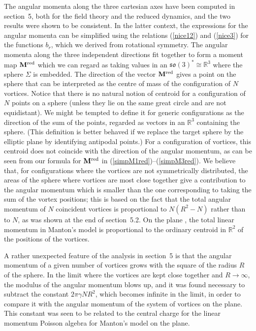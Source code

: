 \documentclass[a4paper,11pt]{article}
\begin{document}
The angular momenta along the three cartesian axes have been computed 
in section~5, both for the field theory and the reduced dynamics,
and the two results were shown to be consistent. In the latter
context, the expressions for the angular momenta can be simplified
using the relations (\ref{nice12}) and (\ref{nice3}) for the functions
$b_{r}$, which we derived from rotational symmetry. The angular momenta
along the three independent directions fit together to form a moment
map $\mathbf{M}^{\rm red}$ which we can regard as taking values in
an $\mathfrak{so}(3)^{*} \cong \mathbb{R}^{3}$ where the sphere $\Sigma$
is embedded. The direction of the vector $\mathbf{M}^{\rm red}$
gives a point on the sphere that can be interpreted as the
centre of mass of the configuration of $N$ vortices. 
Notice that there is no natural notion of
centroid for a configuration of $N$ points on a sphere (unless
they lie on the same great circle and are not equidistant). We might be
tempted to define it for generic configurations as the direction of the 
sum of the points,
regarded as vectors in an $\mathbb{R}^{3}$ containing the sphere.
(This definition is better behaved if we replace the target
sphere by the elliptic plane by identifying antipodal points.)
For a configuration of vortices, this centroid does not coincide
with the direction of the angular momentum, as can be seen from our
formula for $\mathbf{M}^{\rm red}$ in (\ref{simpM1red})--(\ref{simpM3red}).  
We believe that, for configurations where the vortices are not symmetrically
distributed, the areas of the sphere where vortices are most close
together give a contribution to the angular momentum which is smaller
than the one corresponding to taking the sum of the vortex positions; this is
based on the fact that the total angular momentum of $N$ coincident 
vortices is proportional to $N(R^{2}-N)$ rather than to $N$, as was
shown at the end of section~5.2. On the plane \cite{MNcl}, the
total linear momentum in Manton's model is
proportional to the ordinary centroid in $\mathbb{R}^{2}$ of the 
positions of the vortices.


A rather unexpected feature of the analysis in section~5 is that the
angular momentum of a given number of vortices grows with the square
of the radius $R$ of the sphere. In the limit where the vortices are
kept close together and $R\rightarrow \infty$, the modulus of the
angular momentum blows up, and it was found necessary to subtract the
constant $2\pi\gamma N R^{2}$, which becomes infinite in the limit, in 
order to compare it with the angular momentum of the system of
vortices on the plane. This constant was seen to be related to the
central charge for the linear momentum Poisson algebra for 
Manton's model on the plane.
\end{document}
